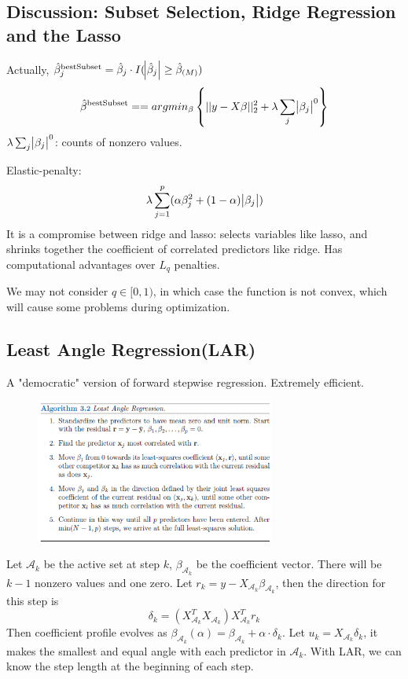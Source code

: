 \subsection{Discussion: Subset Selection, Ridge Regression and the Lasso}
Actually, $\hat{\beta}^{\text{bestSubset}}_j=\hat{\beta}_j\cdot
I(\abs{\hat{\beta}_j}\ge \hat{\beta}_{(M)})$
\begin{equation*}
    \hat{\beta}^{\text{bestSubset}}=
    =argmin_{\beta}\left\{||y-X\beta||_2^2+\lambda \sum_j\abs{\beta_j}^0\right\}
\end{equation*}
$\lambda \sum_j\abs{\beta_j}^0$: counts of nonzero values. 

Elastic-penalty: 
\begin{equation*}
\lambda\sum_{j=1}^p(\alpha\beta_j^2+(1-\alpha)\abs{\beta_j})
\end{equation*}
It is a compromise between ridge and lasso: selects variables like lasso, and 
shrinks together the coefficient of correlated predictors like ridge. Has
computational advantages over $L_q$ penalties. 

We may not consider $q\in[0,1)$, in which case the function is not convex, which will cause
some problems during optimization. 

\subsection{Least Angle Regression(LAR)}
A "democratic" version of forward stepwise regression. Extremely efficient. 
\begin{figure}[H]
    \centering
    \includegraphics[width=0.7\textwidth]{Figures/LARAlgo}
\end{figure}
Let $\mathcal{A}_k$ be the active set at step $k$, $\beta_{\mathcal{A}_k}$ be the 
coefficient vector. There will be $k-1$ nonzero values and one zero. Let 
$r_k=y-X_{\mathcal{A}_k}\beta_{\mathcal{A}_k}$, then the direction for this step is
\begin{equation*}
\delta_k=(X_{\mathcal{A}_k}^TX_{\mathcal{A}_k})X_{\mathcal{A}_k}^Tr_k
\end{equation*}
Then coefficient profile evolves as
$\beta_{\mathcal{A}_k}(\alpha)=\beta_{\mathcal{A}_k}+\alpha\cdot \delta_k$. 
Let $u_k=X_{\mathcal{A}_k}\delta_k$, it makes the smallest and equal angle with each 
predictor in $\mathcal{A}_k$.  With LAR, we can know the step length at the beginning
of each step. 

